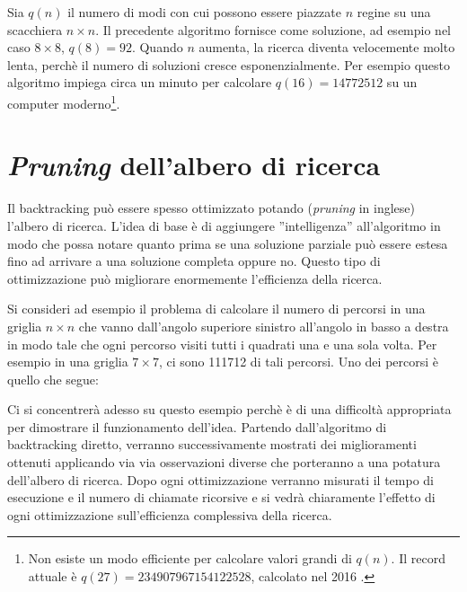 Sia $q(n)$ il numero di modi con cui possono
essere piazzate $n$ regine su una scacchiera $n \times n$.
Il precedente algoritmo fornisce come soluzione,
ad esempio nel caso $8 \times 8$, $q(8)=92$.
Quando $n$ aumenta, la ricerca diventa velocemente molto lenta,
perchè il numero di soluzioni cresce esponenzialmente.
Per esempio questo algoritmo impiega circa un minuto per
calcolare $q(16)=14772512$ su un computer moderno\footnote{
Non esiste un modo efficiente per calcolare valori grandi di $q(n)$. 
Il record attuale è $q(27)=234907967154122528$, calcolato nel 2016 \cite{q27}.}.

\section{\textit{Pruning} dell'albero di ricerca}

Il backtracking può essere spesso ottimizzato 
potando (\textit{pruning} in inglese) l'albero di ricerca.
L'idea di base è di aggiungere 
''intelligenza'' all'algoritmo
in modo che possa notare quanto prima se una
soluzione parziale può essere estesa fino ad arrivare
a una soluzione completa oppure no.
Questo tipo di ottimizzazione può migliorare
enormemente l'efficienza della ricerca.

Si consideri ad esempio il problema di calcolare
il numero di percorsi in una griglia
$n \times n$ che vanno dall'angolo superiore sinistro 
all'angolo in basso a destra in modo tale che
ogni percorso visiti tutti i quadrati una e una sola volta.
Per esempio in una griglia $7 \times 7$,
ci sono 111712 di tali percorsi.
Uno dei percorsi è quello che segue:

\begin{center}
\end{center}

Ci si concentrerà adesso su questo esempio perchè
è di una difficoltà appropriata per dimostrare il funzionamento
dell'idea.
Partendo dall'algoritmo di backtracking diretto,
verranno successivamente mostrati dei miglioramenti
ottenuti applicando via via osservazioni diverse che
porteranno a una potatura dell'albero di ricerca.
Dopo ogni ottimizzazione verranno misurati il tempo di 
esecuzione e il numero di chiamate ricorsive e si vedrà chiaramente
l'effetto di ogni ottimizzazione sull'efficienza complessiva
della ricerca.

